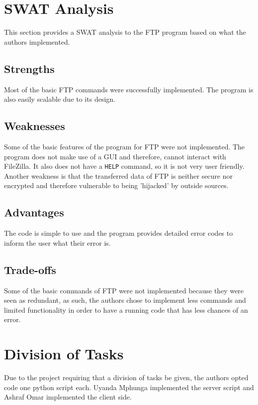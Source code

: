 \documentclass[journal, a4paper]{IEEEtran}
\begin{document}

\section{SWAT Analysis}

This section provides a SWAT analysis to the FTP program based on what the authors implemented. 

\subsection{Strengths}
Most of the basic FTP commands were successfully implemented. The program is also easily scalable due to its design.

\subsection{Weaknesses}
Some of the basic features of the program for FTP were not implemented. The program does not make use of a GUI and therefore, cannot interact with FileZilla. It also does not have a \texttt{HELP} command, so it is not very user friendly. Another weakness is that the transferred data of FTP is neither secure nor encrypted and therefore vulnerable to being 'hijacked' by outside sources.

\subsection{Advantages}
The code is simple to use and the program provides detailed error codes to inform the user what their error is.


\subsection{Trade-offs}
Some of the basic commands of FTP were not implemented because they were seen as redundant, as such, the authors chose to implement less commands and limited functionality in order to have a running code that has less chances of an error.

\section{Division of Tasks}

Due to the project requiring that a division of tasks be given, the authors opted code one python script each. Uyanda Mphunga implemented the server script and Ashraf Omar implemented the client side.
\end{document}
